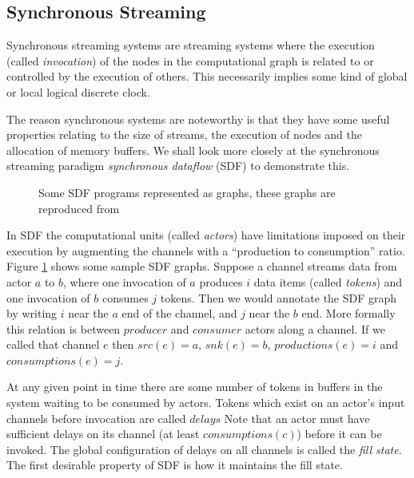 \subsection{Synchronous Streaming}
\label{BACK_SYNC}

Synchronous streaming systems are streaming systems where the execution (called {\em invocation}) of the nodes in the computational graph is related to or controlled by the execution of others.
This necessarily implies some kind of global or local logical discrete clock.

The reason synchronous systems are noteworthy is that they have some useful properties relating to the size of streams, the execution of nodes and the allocation of memory buffers.
We shall look more closely at the synchronous streaming paradigm {\em synchronous dataflow} (SDF) to demonstrate this.

\begin{figure}
\begin{center}
	
\caption{Some SDF programs represented as graphs, these graphs are reproduced from \cite{sdfBook}}
\label{figSimpleSDF}
\end{center}
\end{figure}

In SDF the computational units (called {\em actors}) have limitations imposed on their execution by augmenting the channels with a ``production to consumption'' ratio.
Figure \ref{figSimpleSDF} shows some sample SDF graphs.
Suppose a channel streams data from actor $a$ to $b$, where one invocation of $a$ produces $i$ data items (called {\em tokens}) and one invocation of $b$ consumes $j$ tokens.
Then we would annotate the SDF graph by writing $i$ near the $a$ end of the channel, and $j$ near the $b$ end.
More formally this relation is between $producer$ and $consumer$ actors along a channel.
If we called that channel $e$ then $src(e) = a$, $snk(e) = b$, $productions(e) = i$ and $consumptions(e) = j$.

At any given point in time there are some number of tokens in buffers in the system waiting to be consumed by actors.
Tokens which exist on an actor's input channels before invocation are called $delays$
Note that an actor must have sufficient delays on its channel (at least $consumptions(c)$) before it can be invoked.
The global configuration of delays on all channels is called the {\em fill state}.
The first desirable property of SDF is how it maintains the fill state.

